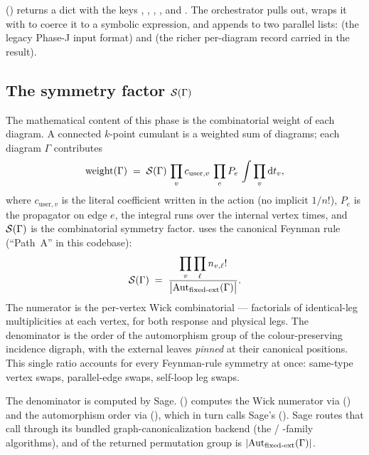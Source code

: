  ()
returns a dict with the keys , ,
, , and .
The orchestrator pulls  out, wraps it with 
to coerce it to a symbolic expression, and appends to two parallel lists:
 (the legacy Phase-J input format) and 
(the richer per-diagram record carried in the result).

\subsection{The symmetry factor \texorpdfstring{$\mathcal{S}(\Gamma)$}{S(Gamma)}}

The mathematical content of this phase is the combinatorial weight of each
diagram. A connected $k$-point cumulant is a weighted sum of diagrams; each
diagram $\Gamma$ contributes
\begin{equation}
  \mathrm{weight}(\Gamma)
  \;=\;
  \mathcal{S}(\Gamma)\,
  \prod_v c_{\mathrm{user},v}\,
  \prod_e P_e\,
  \int \prod_v \mathrm{d} t_v,
  \label{eq:co-weight}
\end{equation}
where $c_{\mathrm{user},v}$ is the literal coefficient written in the action (no
implicit $1/n!$), $P_e$ is the propagator on edge $e$, the integral runs over the
internal vertex times, and $\mathcal{S}(\Gamma)$ is the combinatorial symmetry factor.
\Daedalus{} uses the canonical Feynman rule (``Path~A'' in this codebase):
\begin{equation}
  \mathcal{S}(\Gamma)
  \;=\;
  \frac{\displaystyle\prod_v \prod_\ell n_{v,\ell}!}
       {\bigl|\mathrm{Aut}_{\text{fixed-ext}}(\Gamma)\bigr|}.
  \label{eq:co-Sym}
\end{equation}
The numerator is the per-vertex Wick combinatorial --- factorials of
identical-leg multiplicities at each vertex, for both response and physical legs.
The denominator is the order of the automorphism group of the colour-preserving
incidence digraph, with the external leaves \emph{pinned} at their canonical
positions. This single ratio accounts for every Feynman-rule symmetry at once:
same-type vertex swaps, parallel-edge swaps, self-loop leg swaps.

The denominator is computed by Sage. 
() computes the Wick numerator via
 () and the
automorphism order via 
(), which in turn calls Sage's
(). Sage routes that call through its bundled
graph-canonicalization backend (the  / -family
algorithms), and  of the returned permutation group is
$|\mathrm{Aut}_{\text{fixed-ext}}(\Gamma)|$.

